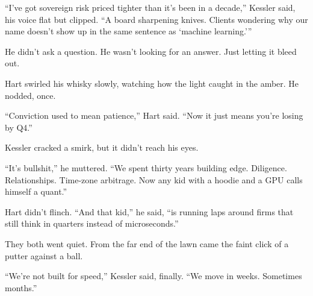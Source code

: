 “I’ve got sovereign risk priced tighter than it’s been in a decade,” Kessler said, his voice flat but clipped. “A board 
sharpening knives. Clients wondering why our name doesn’t show up in the same sentence as ‘machine learning.’”

He didn’t ask a question. He wasn’t looking for an answer. Just letting it bleed out.

Hart swirled his whisky slowly, watching how the light caught in the amber. He nodded, once.

“Conviction used to mean patience,” Hart said. “Now it just means you’re losing by Q4.”

Kessler cracked a smirk, but it didn’t reach his eyes.

“It’s bullshit,” he muttered. “We spent thirty years building edge. Diligence. Relationships. Time-zone 
arbitrage.  Now any kid with a hoodie and a GPU calls himself a quant.”

Hart didn’t flinch. “And that kid,” he said, “is running laps around firms that still think in quarters instead 
of microseconds.”

They both went quiet. From the far end of the lawn came the faint click of a putter against a ball.

“We’re not built for speed,” Kessler said, finally. “We move in weeks. Sometimes months.”

\medskip

